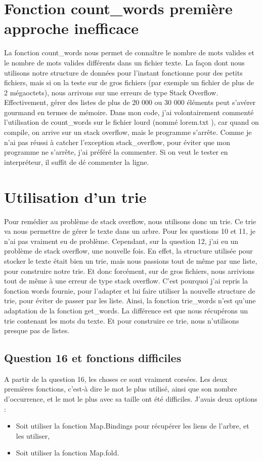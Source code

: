 \documentclass[a4paper, title page, 12pt]{report}
\begin{document}
	\section{Fonction count\_words première approche inefficace}
	La fonction count\_words nous permet de connaître le nombre de mots valides et le nombre de mots valides différents dans un fichier texte. La façon dont nous utilisons notre structure de données pour l'instant fonctionne pour des petits fichiers, mais si on la teste sur de gros fichiers (par exemple un fichier de plus de 2 mégaoctets), nous arrivons sur une erreurs de type Stack Overflow. Effectivement, gérer des listes de plus de 20 000 ou 30 000 éléments peut s'avérer gourmand en termes de mémoire. Dans mon code, j'ai volontairement commenté l'utilisation de count\_words sur le fichier lourd (nommé \og lorem.txt \fg{}), car quand on compile, on arrive sur un stack overflow, mais le programme s'arrête. Comme je n'ai pas réussi à catcher l'exception stack\_overflow, pour éviter que mon programme ne s'arrête, j'ai préféré la commenter. Si on veut le tester en interpréteur, il suffit de dé commenter la ligne. 
	
	\section{Utilisation d'un trie}
	Pour remédier au problème de stack overflow, nous utilisons donc un trie. Ce trie va nous permettre de gérer le texte dans un arbre. Pour les questions 10 et 11, je n'ai pas vraiment eu de problème. Cependant, sur la question 12, j'ai eu un problème de stack overflow, une nouvelle fois. En effet, la structure utilisée pour stocker le texte était bien un trie, mais nous passions tout de même par une liste, pour construire notre trie. Et donc forcément, sur de gros fichiers, nous arrivions tout de même à une erreur de type stack overflow. C'est pourquoi j'ai repris la fonction words fournie, pour l'adapter et lui faire utiliser la nouvelle structure de trie, pour éviter de passer par les liste. Ainsi, la fonction trie\_words n'est qu'une adaptation de la fonction get\_words. La différence est que nous récupérons un trie contenant les mots du texte. Et pour construire ce trie, nous n'utilisons presque pas de listes. 
	
	\subsection{Question 16 et fonctions difficiles}
	A partir de la question 16, les choses ce sont vraiment corsées. Les deux premières fonctions, c'est-à dire le mot le plus utilisé, ainsi que son nombre d’occurrence, et le mot le plus avec sa taille ont été difficiles. J'avais deux options : \\
\begin{itemize}
	\item Soit utiliser la fonction Map.Bindings pour récupérer les liens de l'arbre, et les utiliser,
	\item Soit utiliser la fonction Map.fold. \\
\end{itemize}
\end{document}
